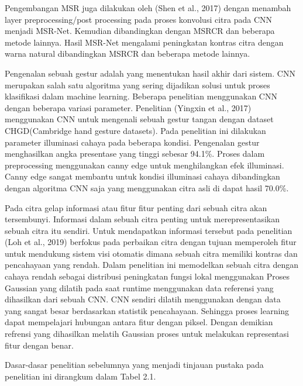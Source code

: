 Pengembangan MSR juga dilakukan oleh (Shen et al., 2017) dengan menambah layer preprocessing/post processing pada proses konvolusi citra pada CNN menjadi MSR-Net. Kemudian dibandingkan dengan MSRCR dan beberapa metode lainnya.  
Hasil MSR-Net mengalami peningkatan kontras citra dengan warna natural dibandingkan MSRCR dan beberapa metode lainnya.

Pengenalan sebuah gestur adalah yang menentukan hasil akhir dari sistem. CNN merupakan salah satu algoritma yang sering dijadikan solusi untuk proses klasifikasi dalam machine learning. Beberapa penelitian menggunakan CNN dengan beberapa variasi parameter. Penelitian (Yingxin et al., 2017) menggunakan CNN untuk mengenali sebuah gestur tangan dengan dataset CHGD(Cambridge hand gesture datasets). Pada penelitian ini dilakukan parameter illuminasi cahaya pada beberapa kondisi. Pengenalan gestur menghasilkan angka presentase yang tinggi sebesar 94.1\%. Proses dalam preprocessing menggunakan canny edge untuk menghilangkan efek illuminasi. Canny edge sangat membantu untuk kondisi illuminasi cahaya dibandingkan dengan algoritma CNN saja yang menggunakan citra asli di dapat hasil 70.0\%.

Pada citra gelap informasi atau fitur fitur penting dari sebuah citra akan tersembunyi. Informasi dalam sebuah citra penting untuk merepresentasikan sebuah citra itu sendiri. Untuk mendapatkan informasi tersebut pada penelitian (Loh et al., 2019) berfokus pada perbaikan citra dengan tujuan memperoleh fitur untuk mendukung sistem visi otomatis dimana sebuah citra memiliki kontras dan pencahayaan yang rendah. Dalam penelitian ini memodelkan sebuah citra dengan cahaya rendah sebagai distribusi peningkatan fungsi lokal menggunakan Proses Gaussian yang dilatih pada saat runtime menggunakan data referensi yang dihasilkan dari sebuah CNN. CNN sendiri dilatih menggunakan dengan data yang sangat besar berdasarkan statistik pencahayaan. Sehingga proses learning dapat mempelajari hubungan antara fitur dengan piksel. Dengan demikian refrensi  yang dihasilkan melatih Gaussian proses untuk melakukan representasi fitur dengan benar. 

Dasar-dasar penelitian sebelumnya yang menjadi tinjauan pustaka pada penelitian ini dirangkum dalam Tabel 2.1. 

